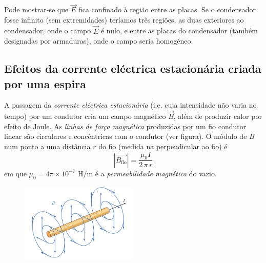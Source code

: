\documentclass[a4paper,twoside,12pt]{article}      %
\begin{document}
\setlength{\unitlength}{1.0cm} 
\begin{center}
\end{center}
Pode mostrar-se que $\vec{E}$ fica confinado à região entre as placas. Se o condensador fosse infinito (sem extremidades) teríamos três regiões, as duas exteriores ao condensador, onde o campo  $\vec{E}$  é nulo, e entre as placas do condensador (também designadas por armaduras), onde o campo seria homogéneo.


\subsection{\sf Efeitos da corrente eléctrica estacionária criada por uma espira}
A passagem da \emph{corrente eléctrica estacionária} (i.e. cuja intensidade não varia no tempo) por um condutor cria um campo magnético $\vec{B}$, além de produzir calor por efeito de Joule. As \emph{linhas de força magnética} produzidas por um fio condutor linear são circulares e concêntricas com o condutor (ver figura). O módulo de $B$ num ponto a uma distância $r$ do fio (medida na perpendicular ao fio) é
\begin{equation}
	|\vec{B_{\mathrm{fio}}}| = \frac{\mu_0 I}{2\, \pi \, r} 
\end{equation}
 em que $\mu_0 =  4 \pi× 10^{−7}$ H/m é a \emph{permeabilidade magnética}  do vazio. 
 
 \begin{figure}[bh]
  \centering 
	\includegraphics[width=0.5\textwidth]{fig-fio} 
\end{figure}
\end{document}
